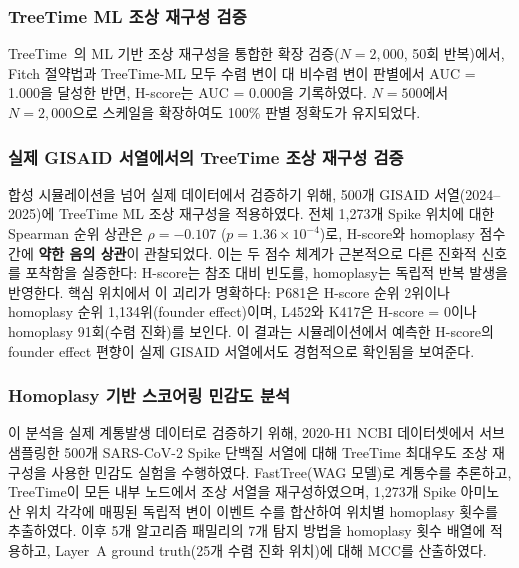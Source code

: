 \subsubsection{TreeTime ML 조상 재구성 검증}
\label{subsec:treetime_ml_validation}

TreeTime~\cite{sagulenko2018treetime}의 ML 기반 조상 재구성을 통합한 확장 검증($N = 2{,}000$, 50회 반복)에서, Fitch 절약법과 TreeTime-ML 모두 수렴 변이 대 비수렴 변이 판별에서 AUC = 1.000을 달성한 반면, H-score는 AUC = 0.000을 기록하였다.
$N = 500$에서 $N = 2{,}000$으로 스케일을 확장하여도 100\% 판별 정확도가 유지되었다.

\subsubsection{실제 GISAID 서열에서의 TreeTime 조상 재구성 검증}
\label{subsec:treetime_gisaid_validation}

합성 시뮬레이션을 넘어 실제 데이터에서 검증하기 위해, 500개 GISAID 서열(2024--2025)에 TreeTime ML 조상 재구성을 적용하였다.
전체 1,273개 Spike 위치에 대한 Spearman 순위 상관은 $\rho = -0.107$ ($p = 1.36 \times 10^{-4}$)로, H-score와 homoplasy 점수 간에 \textbf{약한 음의 상관}이 관찰되었다.
이는 두 점수 체계가 근본적으로 다른 진화적 신호를 포착함을 실증한다: H-score는 참조 대비 빈도를, homoplasy는 독립적 반복 발생을 반영한다.
핵심 위치에서 이 괴리가 명확하다: P681은 H-score 순위 2위이나 homoplasy 순위 1,134위(founder effect)이며, L452와 K417은 H-score = 0이나 homoplasy 91회(수렴 진화)를 보인다.
이 결과는 시뮬레이션에서 예측한 H-score의 founder effect 편향이 실제 GISAID 서열에서도 경험적으로 확인됨을 보여준다.

\subsubsection{Homoplasy 기반 스코어링 민감도 분석}
\label{subsec:homoplasy_sensitivity}

이 분석을 실제 계통발생 데이터로 검증하기 위해, 2020-H1 NCBI 데이터셋에서 서브샘플링한 500개 SARS-CoV-2 Spike 단백질 서열에 대해 TreeTime 최대우도 조상 재구성을 사용한 민감도 실험을 수행하였다.
FastTree(WAG 모델)로 계통수를 추론하고, TreeTime이 모든 내부 노드에서 조상 서열을 재구성하였으며, 1,273개 Spike 아미노산 위치 각각에 매핑된 독립적 변이 이벤트 수를 합산하여 위치별 homoplasy 횟수를 추출하였다.
이후 5개 알고리즘 패밀리의 7개 탐지 방법을 homoplasy 횟수 배열에 적용하고, Layer~A ground truth(25개 수렴 진화 위치)에 대해 MCC를 산출하였다.

